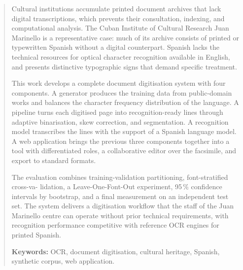 \begin{abstract}
	Cultural institutions accumulate printed document archives that lack digital transcriptions, which prevents their consultation, indexing, and computational analysis. The Cuban Institute of Cultural Research Juan Marinello is a representative case: much of its archive consists of printed or typewritten Spanish without a digital counterpart. Spanish lacks the technical resources for optical character recognition available in English, and presents distinctive typographic signs that demand specific treatment.
	
	This work develops a complete document digitisation system with four components. A generator produces the training data from public-domain works and balances the character frequency distribution of the language. A pipeline turns each digitised page into recognition-ready lines through adaptive binarisation, skew correction, and segmentation. A recognition model transcribes the lines with the support of a Spanish language model. A web application brings the previous three components together into a tool with differentiated roles, a collaborative editor over the facsimile, and export to standard formats.
	
	The evaluation combines training-validation partitioning, font-stratified cross-va- lidation, a Leave-One-Font-Out experiment, 95\,\% confidence intervals by bootstrap, and a final measurement on an independent test set. The system delivers a digitisation workflow that the staff of the Juan Marinello centre can operate without prior technical requirements, with recognition performance competitive with reference OCR engines for printed Spanish.
	
	\textbf{Keywords:} OCR, document digitisation, cultural heritage, Spanish, synthetic corpus, web application.
\end{abstract}